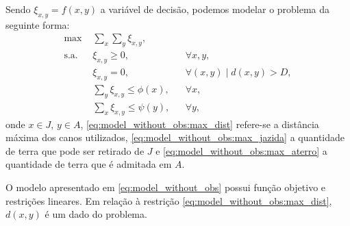Sendo $\xi_{x, y} = f(x, y)$ a variável de decisão, podemos modelar o problema
da seguinte forma:
\begin{subequations}
    \begin{align}
        \text{max } & \sum_{x} \sum_{y} \xi_{x, y},
        \label{eq:model_without_obs:obj_func} \\
        \text{s.a. } & \xi_{x, y} \geq 0, && \forall x, y,
        \label{eq:model_without_obs:var} \\
        & \xi_{x, y} = 0, && \forall (x, y) \mid d(x, y) > D,
        \label{eq:model_without_obs:max_dist} \\
        & \sum_{y} \xi_{x, y} \leq \phi(x), && \forall x,
        \label{eq:model_without_obs:max_jazida} \\
        & \sum_{x} \xi_{x, y} \leq \psi(y), && \forall y,
        \label{eq:model_without_obs:max_aterro}
    \end{align}
    \label{eq:model_without_obs}
\end{subequations}
onde $x \in J$, $y \in A$, \eqref{eq:model_without_obs:max_dist} refere-se a
distância máxima dos canos utilizados, \eqref{eq:model_without_obs:max_jazida} a
quantidade de terra que pode ser retirado de $J$ e
\eqref{eq:model_without_obs:max_aterro} a quantidade de terra que é admitada em $A$.

O modelo apresentado em \eqref{eq:model_without_obs} possui função objetivo e
restrições lineares. Em relação à restrição
\eqref{eq:model_without_obs:max_dist}, $d(x, y)$ é um dado do problema.

